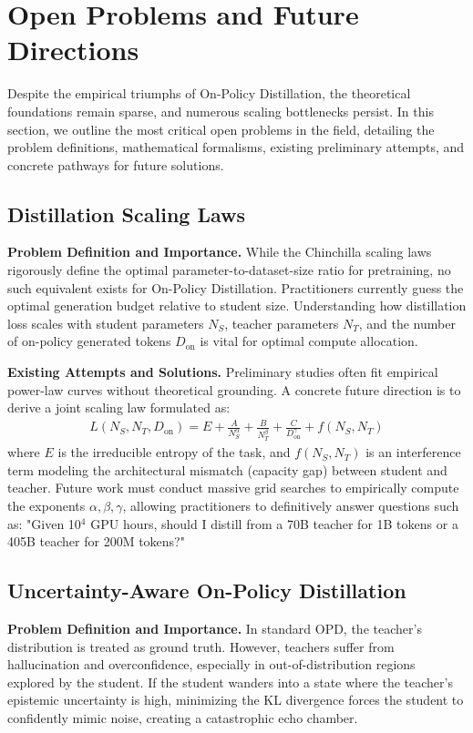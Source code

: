 \documentclass{article} %
\begin{document}
\section{Open Problems and Future Directions}
\label{sec:future}

Despite the empirical triumphs of On-Policy Distillation, the theoretical foundations remain sparse, and numerous scaling bottlenecks persist. In this section, we outline the most critical open problems in the field, detailing the problem definitions, mathematical formalisms, existing preliminary attempts, and concrete pathways for future solutions.

\subsection{Distillation Scaling Laws}
\textbf{Problem Definition and Importance.} While the Chinchilla scaling laws rigorously define the optimal parameter-to-dataset-size ratio for pretraining, no such equivalent exists for On-Policy Distillation. Practitioners currently guess the optimal generation budget relative to student size. Understanding how distillation loss scales with student parameters $N_S$, teacher parameters $N_T$, and the number of on-policy generated tokens $D_{\text{on}}$ is vital for optimal compute allocation.

\textbf{Existing Attempts and Solutions.} Preliminary studies often fit empirical power-law curves without theoretical grounding. A concrete future direction is to derive a joint scaling law formulated as:
\begin{align}
L(N_S, N_T, D_{\text{on}}) = E + \frac{A}{N_S^\alpha} + \frac{B}{N_T^\beta} + \frac{C}{D_{\text{on}}^\gamma} + f(N_S, N_T) \label{eq:scaling}
\end{align}
where $E$ is the irreducible entropy of the task, and $f(N_S, N_T)$ is an interference term modeling the architectural mismatch (capacity gap) between student and teacher. Future work must conduct massive grid searches to empirically compute the exponents $\alpha, \beta, \gamma$, allowing practitioners to definitively answer questions such as: "Given 10$^4$ GPU hours, should I distill from a 70B teacher for 1B tokens or a 405B teacher for 200M tokens?"

\subsection{Uncertainty-Aware On-Policy Distillation}
\textbf{Problem Definition and Importance.} In standard OPD, the teacher's distribution is treated as ground truth. However, teachers suffer from hallucination and overconfidence, especially in out-of-distribution regions explored by the student. If the student wanders into a state where the teacher's epistemic uncertainty is high, minimizing the KL divergence forces the student to confidently mimic noise, creating a catastrophic echo chamber.
\end{document}
